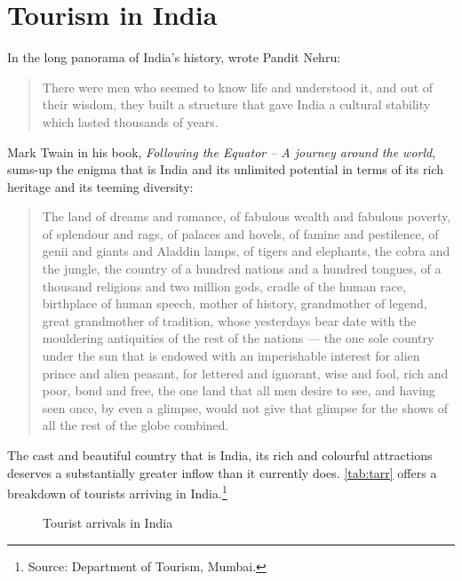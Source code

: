 \chapter{Tourism in India} %
\label{cha:tii}

In the long panorama of India's history, wrote Pandit Nehru:

\begin{quote}
  There were men who seemed to know life and understood it, and out of their wisdom, they built a structure that gave India a cultural stability which lasted thousands of years.
\end{quote}

\noindent Mark Twain in his book, \emph{Following the Equator -- A journey around the world}, sums-up the enigma that is India and its unlimited potential in terms of its rich heritage and its teeming diversity: 

\begin{quote}
  The land of dreams and romance, of fabulous wealth and fabulous poverty, of splendour and rags, of palaces and hovels, of famine and pestilence, of genii and giants and Aladdin lamps, of tigers and elephants, the cobra and the jungle, the country of a hundred nations and a hundred tongues, of a thousand religions and two million gods, cradle of the human race, birthplace of human speech, mother of history, grandmother of legend, great grandmother of tradition, whose yesterdays bear date with the mouldering antiquities of the rest of the nations --- the one sole country under the sun that is endowed with an imperishable interest for alien prince and alien peasant, for lettered and ignorant, wise and fool, rich and poor, bond and free, the one land that all men desire to see, and having seen once, by even a glimpse, would not give that glimpse for the shows of all the rest of the globe combined.
\end{quote}

\noindent The cast and beautiful country that is India, its rich and colourful attractions deserves a substantially greater inflow than it currently does. \autoref{tab:tarr} offers a breakdown of tourists arriving in India.\footnote{Source: Department of Tourism, Mumbai.}

\begin{figure}[H]
  \centering
  
  \caption{Tourist arrivals in India}
  \label{fig:visitors}
\end{figure}

